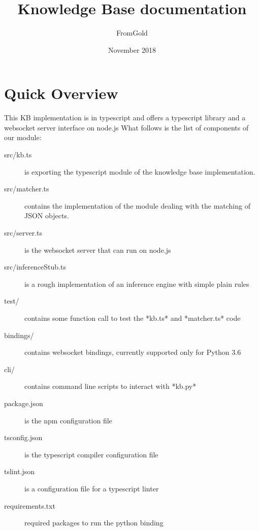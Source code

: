 \documentclass{article}
\title{Knowledge Base documentation}
\author{FromGold}
\date{November 2018}
\begin{document}
\maketitle

\section{Quick Overview}
This KB implementation is in typescript and offers a typescript library and a websocket server interface on node.js
What follows is the list of components of our module:
\begin{description}
    \item[src/kb.ts] is exporting the typescript module of the knowledge base implementation.
    \item[src/matcher.ts] contains the implementation of the module dealing with the matching of JSON objects.
    \item[src/server.ts] is the websocket server that can run on node.js
    \item[src/inferenceStub.ts] is a rough implementation of an inference engine with simple plain rules
    \item[test/] contains some function call to test the *kb.ts* and *matcher.ts* code
    \item[bindings/] contains websocket bindings, currently supported only for Python 3.6
    \item[cli/] contains command line scripts to interact with *kb.py*
    \item[package.json] is the npm configuration file
    \item[tsconfig.json] is the typescript compiler configuration file
    \item[tslint.json] is a configuration file for a typescript linter
    \item[requirements.txt] required packages to run the python binding
\end{description}
\end{document}
